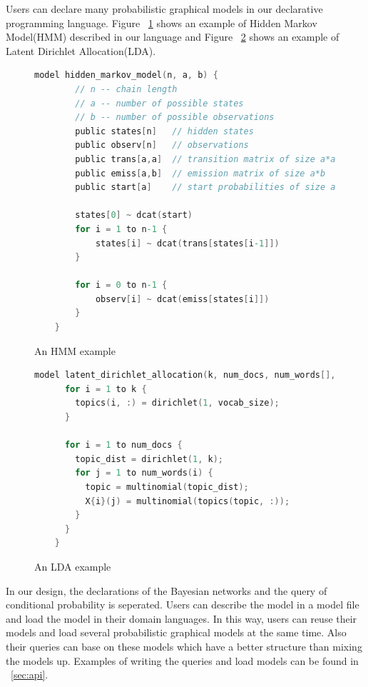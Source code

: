 Users can declare many probabilistic graphical models in our declarative programming language. Figure ~\ref{fig:hmm} shows an example of Hidden Markov Model(HMM) described in our language and Figure ~\ref{fig:ldacode} shows an example of Latent Dirichlet Allocation(LDA).

\begin{figure}
  \begin{lstlisting}[language=C]
    model hidden_markov_model(n, a, b) {
        // n -- chain length
        // a -- number of possible states
        // b -- number of possible observations
        public states[n]   // hidden states
        public observ[n]   // observations
        public trans[a,a]  // transition matrix of size a*a
        public emiss[a,b]  // emission matrix of size a*b
        public start[a]    // start probabilities of size a

        states[0] ~ dcat(start)
        for i = 1 to n-1 {
            states[i] ~ dcat(trans[states[i-1]])
        }

        for i = 0 to n-1 {
            observ[i] ~ dcat(emiss[states[i]])
        }
    }
  \end{lstlisting}
  \caption{An HMM example}
  \label{fig:hmm}
\end{figure}

\begin{figure}
  \begin{lstlisting}[language=C]
    model latent_dirichlet_allocation(k, num_docs, num_words[], vocab_size) {
      for i = 1 to k {
        topics(i, :) = dirichlet(1, vocab_size);
      }
      
      for i = 1 to num_docs {
        topic_dist = dirichlet(1, k);
        for j = 1 to num_words(i) {
          topic = multinomial(topic_dist);
          X{i}(j) = multinomial(topics(topic, :));
        }
      }
    }
  \end{lstlisting}
  \caption{An LDA example}
  \label{fig:ldacode}
\end{figure}

In our design, the declarations of the Bayesian networks and the query of conditional probability is seperated. Users can describe the model in a model file and load the model in their domain languages. In this way, users can reuse their models and load several probabilistic graphical models at the same time. Also their queries can base on these models which have a better structure than mixing the models up. Examples of writing the queries and load models can be found in ~\ref{sec:api}.

